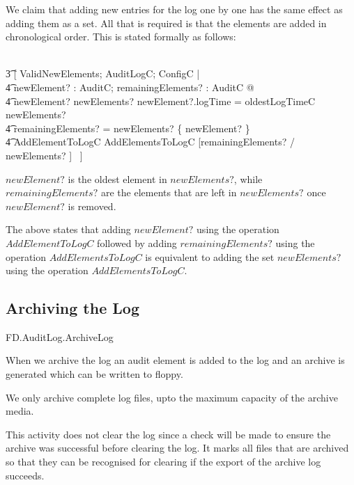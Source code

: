 We claim that adding new entries for the log one by one has the same
effect as adding them as a set. All that is required is that the
elements are added in chronological order. This is stated formally as follows:

\begin{argue}
 \equiv 
\\ \t3 [ ValidNewElements; \Delta AuditLogC; ConfigC | 
\\ \t4 \exists newElement? : AuditC;
        remainingElements? : \finset AuditC @ 
\\ \t4  newElement? \in newElements? 
        \land newElement?.logTime = oldestLogTimeC~ newElements?
\\  \t4 
        \land remainingElements? = newElements? \setminus \{ newElement? \}
\\ \t4  \land AddElementToLogC \semi AddElementsToLogC
        [remainingElements? / newElements? ]  ~]  
 
\end{argue}
\begin{Zcomment}
\item
$newElement?$ is the oldest element in
$newElements?$, while $remainingElements?$ are the elements that are left in
$newElements?$ once $newElement?$ is removed. 
\item
The above states that adding $newElement?$ using the operation
$AddElementToLogC$ followed by adding $remainingElements?$ using the
operation $AddElementsToLogC$ is equivalent to adding the set
$newElements?$ using the operation $AddElementsToLogC$.
\end{Zcomment}

\subsection{Archiving the Log}

\begin{traceunit}{FD.AuditLog.ArchiveLog}
\end{traceunit}


When we archive the log an audit element is added to the log and an
archive is generated which can be written to floppy. 

We only archive complete log files, upto the maximum capacity of the
archive media.

This activity does not clear the log since a check will be made to
ensure the archive was successful before clearing the log. It marks
all files that are archived so that they can be recognised for clearing
if the export of the archive log succeeds.

